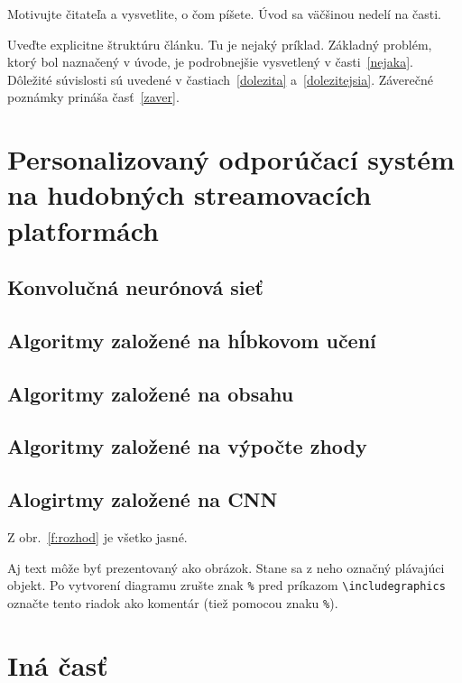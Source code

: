 \documentclass[10pt,twoside,slovak,a4paper, colorinlistoftodos]{article}
\begin{document}
Motivujte čitateľa a vysvetlite, o čom píšete. Úvod sa väčšinou nedelí na časti.

Uveďte explicitne štruktúru článku. Tu je nejaký príklad.
Základný problém, ktorý bol naznačený v úvode, je podrobnejšie vysvetlený v časti~\ref{nejaka}.
Dôležité súvislosti sú uvedené v častiach~\ref{dolezita} a~\ref{dolezitejsia}.
Záverečné poznámky prináša časť~\ref{zaver}.



\section{Personalizovaný odporúčací systém na hudobných streamovacích platformách} \label{1}
\subsection{Konvolučná neurónová sieť} \label{1:1}
\subsection{Algoritmy založené na hĺbkovom učení} \label{1:2}
\subsection{Algoritmy založené na obsahu} \label{1:3}
\subsection{Algoritmy založené na výpočte zhody} \label{1:4}
\subsection{Alogirtmy založené na CNN} \label{1:1}

Z obr.~\ref{f:rozhod} je všetko jasné. 

\begin{figure*}[tbh]
\centering
Aj text môže byť prezentovaný ako obrázok. Stane sa z neho označný plávajúci objekt. Po vytvorení diagramu zrušte znak \texttt{\%} pred príkazom \verb|\includegraphics| označte tento riadok ako komentár (tiež pomocou znaku \texttt{\%}).
\caption{Rozhodujúci argument.}
\label{f:rozhod}
\end{figure*}



\section{Iná časť} \label{ina}
\end{document}
